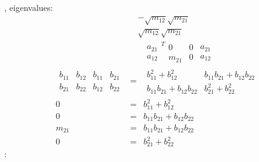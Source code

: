 \documentclass{article}
\begin{document}
, eigenvalues: 
\begin{eqnarray*}
&&-\sqrt{m_{12}}\sqrt{m_{21}} \\
&&\sqrt{m_{12}}\sqrt{m_{21}}
\end{eqnarray*}%
\begin{eqnarray*}
&&%
\begin{array}{c}
a_{21} \\ 
a_{12}%
\end{array}%
^{T}%
\begin{array}{cc}
0 & 0 \\ 
m_{21} & 0%
\end{array}%
\begin{array}{c}
a_{21} \\ 
a_{12}%
\end{array}
\\
\begin{array}{cc}
b_{11} & b_{12} \\ 
b_{21} & b_{22}%
\end{array}%
\begin{array}{cc}
b_{11} & b_{21} \\ 
b_{12} & b_{22}%
\end{array}
&=&%
\begin{array}{cc}
b_{11}^{2}+b_{12}^{2} & b_{11}b_{21}+b_{12}b_{22} \\ 
b_{11}b_{21}+b_{12}b_{22} & b_{21}^{2}+b_{22}^{2}%
\end{array}
\\
0 &=&b_{11}^{2}+b_{12}^{2} \\
0 &=&b_{11}b_{21}+b_{12}b_{22} \\
m_{21} &=&b_{11}b_{21}+b_{12}b_{22} \\
0 &=&b_{21}^{2}+b_{22}^{2}
\end{eqnarray*}
: 
\end{document}
